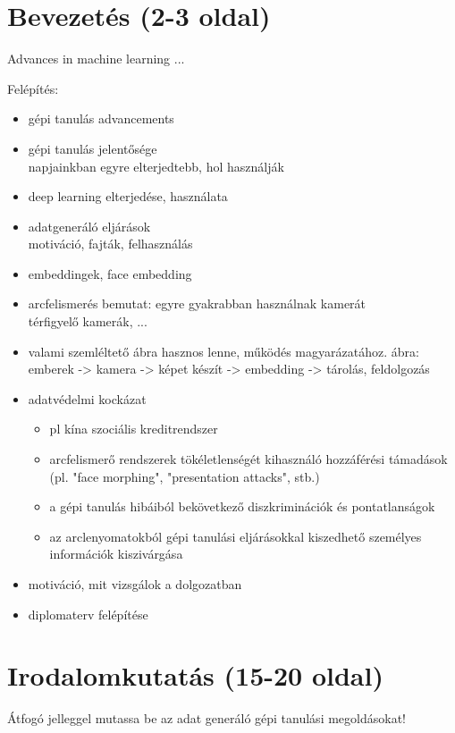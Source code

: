 \section{Bevezetés (2-3 oldal)}

Advances in machine learning ...

Felépítés:
\begin{itemize}
	\item gépi tanulás advancements
	\item gépi tanulás jelentősége \\ napjainkban egyre elterjedtebb, hol használják
	\item deep learning elterjedése, használata
	\item adatgeneráló eljárások \\ motiváció, fajták, felhasználás
	\item embeddingek, face embedding
	\item arcfelismerés bemutat: egyre gyakrabban használnak kamerát \\ térfigyelő kamerák, ...
	\item valami szemléltető ábra hasznos lenne, működés magyarázatához. ábra: emberek -> kamera -> képet készít -> embedding -> tárolás, feldolgozás
	\item adatvédelmi kockázat
	\begin{itemize}
		\item pl kína szociális kreditrendszer
		\item  arcfelismerő rendszerek tökéletlenségét kihasználó hozzáférési támadások (pl. "face morphing", "presentation attacks", stb.)
		\item a gépi tanulás hibáiból bekövetkező diszkriminációk és pontatlanságok
		\item az arclenyomatokból gépi tanulási eljárásokkal kiszedhető személyes információk kiszivárgása
	\end{itemize}
	\item motiváció, mit vizsgálok a dolgozatban
	\item diplomaterv felépítése
\end{itemize}

\section{Irodalomkutatás (15-20 oldal)}
Átfogó jelleggel mutassa be az adat generáló gépi tanulási megoldásokat!


